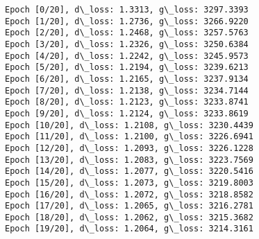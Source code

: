 \documentclass[11pt]{article}
\begin{document}
    \begin{Verbatim}[commandchars=\\\{\}]
Epoch [0/20], d\_loss: 1.3313, g\_loss: 3297.3393
Epoch [1/20], d\_loss: 1.2736, g\_loss: 3266.9220
Epoch [2/20], d\_loss: 1.2468, g\_loss: 3257.5763
Epoch [3/20], d\_loss: 1.2326, g\_loss: 3250.6384
Epoch [4/20], d\_loss: 1.2242, g\_loss: 3245.9573
Epoch [5/20], d\_loss: 1.2194, g\_loss: 3239.6213
Epoch [6/20], d\_loss: 1.2165, g\_loss: 3237.9134
Epoch [7/20], d\_loss: 1.2138, g\_loss: 3234.7144
Epoch [8/20], d\_loss: 1.2123, g\_loss: 3233.8741
Epoch [9/20], d\_loss: 1.2124, g\_loss: 3233.8619
Epoch [10/20], d\_loss: 1.2108, g\_loss: 3230.4439
Epoch [11/20], d\_loss: 1.2100, g\_loss: 3226.6941
Epoch [12/20], d\_loss: 1.2093, g\_loss: 3226.1228
Epoch [13/20], d\_loss: 1.2083, g\_loss: 3223.7569
Epoch [14/20], d\_loss: 1.2077, g\_loss: 3220.5416
Epoch [15/20], d\_loss: 1.2073, g\_loss: 3219.8003
Epoch [16/20], d\_loss: 1.2072, g\_loss: 3218.8582
Epoch [17/20], d\_loss: 1.2065, g\_loss: 3216.2781
Epoch [18/20], d\_loss: 1.2062, g\_loss: 3215.3682
Epoch [19/20], d\_loss: 1.2064, g\_loss: 3214.3161
    \end{Verbatim}
\end{document}
